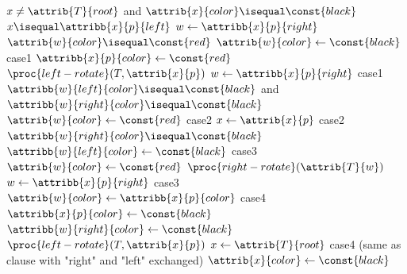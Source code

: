 \documentclass[UTF8,11pt,openany]{ctexbook}
\begin{document}
\begin{codebox}
	\li  \While $ x \ne  \attrib{T}{root}$ and  $\attrib{x}{color} \isequal \const{black}$
	\li  \Do  \If $x \isequal \attribb{x}{p}{left}$
	\li   	\Then 
	$ w \gets \attribb{x}{p}{right} $
	\li		   \If $ \attrib{w}{color} \isequal \const{red}$
	\li		     \Then 
	$ \attrib{w}{color} \gets \const{black} $    				\RComment case1
	\li			 $ \attribb{x}{p}{color} \gets \const{red} $
	\li  			 $ \proc{left-rotate}(T,\attrib{x}{p}) $
	\li			 $ w \gets \attribb{x}{p}{right} $      		\RComment case1
	\End
	\li          \If $ \attribb{w}{left}{color} \isequal \const{black}$ and $ \attribb{w}{right}{color} \isequal \const{black} $ 	
	\li            \Then 
	$ \attrib{w}{color} \gets \const{red} $    					\RComment case2	  
	\li            $ x \gets \attrib{x}{p} $     				\RComment case2
	\li          \Else
	\If $ \attribb{w}{right}{color} \isequal \const{black} $	
	\li              \Then 
	$ \attribb{w}{left}{color} \gets \const{black} $            \RComment case3
	\li 			   $ \attrib{w}{color} \gets \const{red}   $	
	\li 			   $\proc{right-rotate}(\attrib{T}{w})$	
	\li 			   $w \gets \attribb{x}{p}{right}$          \RComment case3	 
	\End
	\li            $ \attrib{w}{color} \gets \attribb{x}{p}{color} $  \RComment case4
	\li            $ \attribb{x}{p}{color} \gets \const{black} $
	\li            $ \attribb{w}{right}{color} \gets \const{black} $
	\li 			 $\proc{left-rotate}(T,\attrib{x}{p})$	
	\li            $ x \gets \attrib{T}{root} $                      \RComment case4
	             \End
	\li        \Else (same as  clause with "right" and "left" exchanged)
	           \End
	      \End
	\li  $ \attrib{x}{color} \gets \const{black} $
\end{codebox}

\newpage 
\
\end{document}
